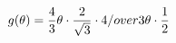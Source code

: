 \documentclass[preview]{standalone}
\begin{document}
\begin{align*}
g( \theta ) = {4 \over 3} \theta \cdot {2 \over \sqrt{3}} \cdot {4 /over 3} \theta \cdot {1 \over 2}
\end{align*}
\end{document}
